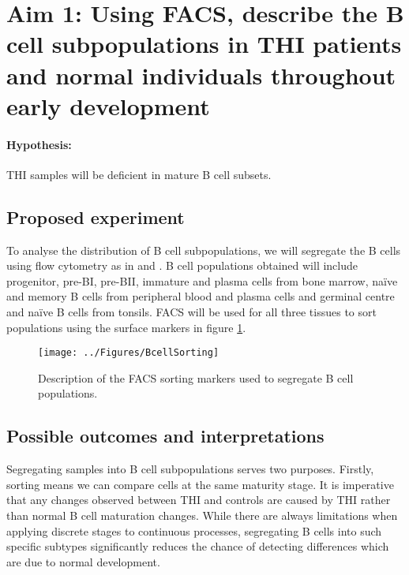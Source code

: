 \documentclass[12pt]{article}
\newcommand{\naive}{na\"{i}ve }
\begin{document}
	\section{Aim 1: {\large Using FACS, describe the B cell subpopulations in THI patients and normal individuals throughout early development}}
	
		\paragraph{Hypothesis:} THI samples will be deficient in mature B cell subsets.
		
		\subsection{Proposed experiment}
		
				To analyse the distribution of B cell subpopulations, we will segregate the B cells using flow cytometry as in \citet{Kulis15} and \citet{Oakes16}.
				B cell populations obtained will include progenitor, pre-BI, pre-BII, immature and plasma cells from bone marrow, \naive and memory B cells from peripheral blood and plasma cells and germinal centre and \naive B cells from tonsils. 
				FACS will be used for all three tissues to sort populations using the surface markers in figure \ref{fig:BCellSorting}.
				
				\begin{figure}[tb]
					\centering
					\texttt{[image: ../Figures/BcellSorting]}
					\caption{Description of the FACS sorting markers used to segregate B cell populations.}
					\label{fig:BCellSorting} 
				\end{figure}

		
		\subsection{Possible outcomes and interpretations}		
		
		
			Segregating samples into B cell subpopulations serves two purposes. 
			Firstly, sorting means we can compare cells at the same maturity stage.
			It is imperative that any changes observed between THI and controls are caused by THI rather than normal B cell maturation changes.
			While there are always limitations when applying discrete stages to continuous processes, segregating B cells into such specific subtypes significantly reduces the chance of detecting differences which are due to normal development. 
			
\end{document}
